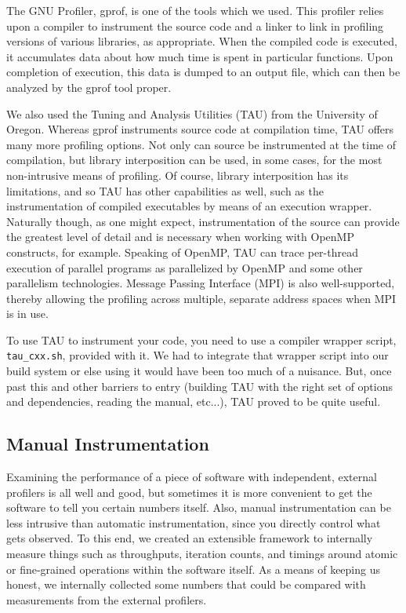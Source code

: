 \documentclass{article}
\begin{document}
The GNU Profiler, gprof, is one of the tools which we used. This profiler relies upon a compiler to instrument the source code and a linker to link in profiling versions of various libraries, as appropriate. When the compiled code is executed, it accumulates data about how much time is spent in particular functions. Upon completion of execution, this data is dumped to an output file, which can then be analyzed by the gprof tool proper.


We also used the Tuning and Analysis Utilities (TAU) from the University of Oregon. Whereas gprof instruments source code at compilation time, TAU offers many more profiling options. Not only can source be instrumented at the time of compilation, but library interposition can be used, in some cases, for the most non-intrusive means of profiling. Of course, library interposition has its limitations, and so TAU has other capabilities as well, such as the instrumentation of compiled executables by means of an execution wrapper. Naturally though, as one might expect, instrumentation of the source can provide the greatest level of detail and is necessary when working with OpenMP constructs, for example. Speaking of OpenMP, TAU can trace per-thread execution of parallel programs as parallelized by OpenMP and some other parallelism technologies. Message Passing Interface (MPI) is also well-supported, thereby allowing the profiling across multiple, separate address spaces when MPI is in use.

To use TAU to instrument your code, you need to use a compiler wrapper script, \texttt{tau\_cxx.sh}, provided with it. We had to integrate that wrapper script into our build system or else using it would have been too much of a nuisance. But, once past this and other barriers to entry (building TAU with the right set of options and dependencies, reading the manual, etc...), TAU proved to be quite useful.


\subsection{Manual Instrumentation}

Examining the performance of a piece of software with independent, external profilers is all well and good, but sometimes it is more convenient to get the software to tell you certain numbers itself. Also, manual instrumentation can be less intrusive than automatic instrumentation, since you directly control what gets observed. To this end, we created an extensible framework to internally measure things such as throughputs, iteration counts, and timings around atomic or fine-grained operations within the software itself. As a means of keeping us honest, we internally collected some numbers that could be compared with measurements from the external profilers.
\end{document}
